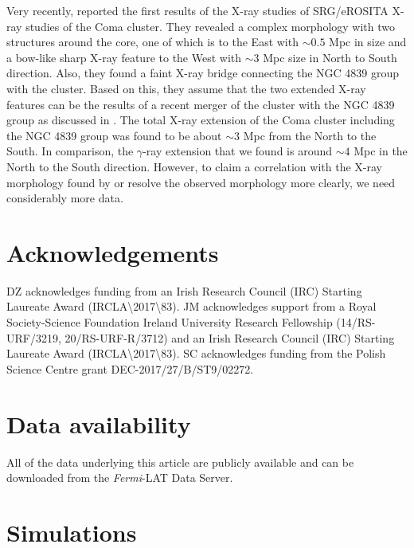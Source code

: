 \documentclass[fleqn,usenatbib]{mnras}
\begin{document}
Very recently, \citet{2021A&A...651A..41C} reported the first results of the X-ray studies of SRG/eROSITA X-ray studies of the Coma cluster. They revealed a complex morphology with two structures around the core, one of which is to the East with $\mathrm{\sim0.5}$ Mpc in size and a bow-like sharp X-ray feature to the West with $\mathrm{\sim3}$ Mpc size in North to South direction. Also, they found a faint X-ray bridge connecting the NGC 4839 group with the cluster. Based on this, they assume that the two extended X-ray features can be the results of a recent merger of the cluster with the NGC 4839 group as discussed in \citet{2021MNRAS.501.1038Z}. The total X-ray extension of the Coma cluster including the NGC 4839 group was found to be about $\mathrm{\sim3}$ Mpc from the North to the South. In comparison, the $\gamma$-ray extension that we found is around $\mathrm{\sim4}$ Mpc in the North to the South direction. However, to claim a correlation with the X-ray morphology found by \citet{2021A&A...651A..41C} or resolve the observed morphology more clearly, we need considerably more data.

\section*{Acknowledgements}
DZ acknowledges funding from an Irish Research Council (IRC) Starting Laureate Award (IRCLA\textbackslash 2017\textbackslash 83).
JM acknowledges support from a Royal Society-Science Foundation Ireland University Research Fellowship (14/RS-URF/3219, 20/RS-URF-R/3712) and an Irish Research Council (IRC) Starting Laureate Award (IRCLA\textbackslash 2017\textbackslash 83). SC acknowledges funding from the Polish Science Centre grant DEC-2017/27/B/ST9/02272.  
\section*{Data availability}

All of the data underlying this article are publicly available and can be downloaded from the \textit{Fermi}-LAT Data Server.





\appendix

\section{Simulations}
\end{document}
